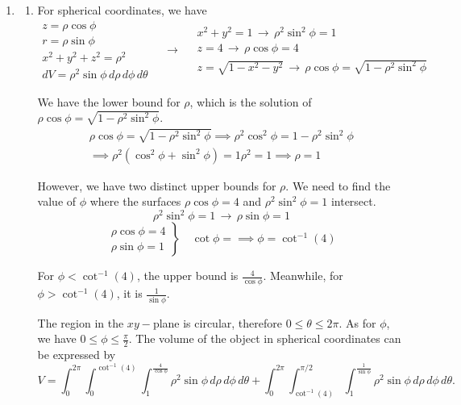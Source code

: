 \documentclass[a4paper, 12pt]{article}
\begin{document}
\begin{enumerate}[leftmargin=*,label=\textbf{\arabic*.}]
\begin{enumerate}[leftmargin=*,label=\textbf{\alph*.}]
If we switch to polar coordinates, we can easily evaluate the integral.
\[A=\sqrt2\int_0^{2\pi}\int_1^2\,r\,dr\,d\theta=\sqrt2\int_0^{2\pi}\left[\frac{r^2}2\right]_{r=1}^{r=2}\,d\theta=\sqrt2\int_0^{2\pi}\frac32\,d\theta=\boxed{3\pi\sqrt2}\]
\end{enumerate}

\item \begin{enumerate}[leftmargin=*,label=\textbf{\alph*.}]
\item For spherical coordinates, we have
\[
\begin{array}{c}
z=\rho\cos\phi\\
r=\rho\sin\phi\\
x^2+y^2+z^2=\rho^2\\
dV=\rho^2\sin\phi\,d\rho\,d\phi\,d\theta
\end{array}\quad\rightarrow\quad
\begin{array}{c}
x^2+y^2=1\,\rightarrow\,\rho^2\sin^2\phi = 1\\
z=4\,\rightarrow\,\rho\cos\phi=4\\
z=\sqrt{1-x^2-y^2}\,\rightarrow\,\rho\cos\phi=\sqrt{1-\rho^2\sin^2\phi}
\end{array}
\]

We have the lower bound for $\rho$, which is the solution of $\rho\cos\phi=\sqrt{1-\rho^2\sin^2\phi}$.
\[
\begin{array}{c}
\rho\cos\phi=\sqrt{1-\rho^2\sin^2\phi}\implies\rho^2\cos^2\phi=1-\rho^2\sin^2\phi\\
\implies
\rho^2\left(\cos^2\phi+\sin^2\phi\right)=1
\rho^2=1\implies\rho=1
\end{array}
\]

However, we have two distinct upper bounds for $\rho$. We need to find the value of $\phi$ where the surfaces $\rho\cos\phi = 4$ and $\rho^2\sin^2\phi=1$ intersect.
\[\rho^2\sin^2\phi=1 \,\rightarrow\,\rho\sin\phi = 1\]
\[
\left.
\begin{array}{c}
\rho\cos\phi=4\\
\rho\sin\phi=1
\end{array}
\right\}\quad\cot\phi=\implies\phi=\cot^{-1}(4)
\]

For $\phi<\cot^{-1}(4)$, the upper bound is $\frac4{\cos\phi}$. Meanwhile, for $\phi>\cot^{-1}(4)$, it is $\frac1{\sin\phi}$.

The region in the $xy-$plane is circular, therefore $0\leq\theta\leq2\pi$. As for $\phi$, we have $0\leq\phi\leq\frac{\pi}2$. The volume of the object in spherical coordinates can be expressed by
\[
\boxed{
V=\displaystyle\int_0^{2\pi}\int_0^{\cot^{-1}(4)}\int_1^{\textstyle\frac4{\cos\phi}}\rho^2\sin\phi\,d\rho\,d\phi\,d\theta
+\int_0^{2\pi}\int_{\cot^{-1}(4)}^{\pi/2}\int_1^{\textstyle\frac1{\sin\phi}}\rho^2\sin\phi\,d\rho\,d\phi\,d\theta 
}
.\]


\end{enumerate}
\end{enumerate}
\end{document}
